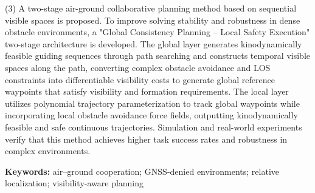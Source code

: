 (3) A two-stage air-ground collaborative planning method based on sequential visible spaces is proposed. To improve solving stability and robustness in dense obstacle environments, a "Global Consistency Planning – Local Safety Execution" two-stage architecture is developed. The global layer generates kinodynamically feasible guiding sequences through path searching and constructs temporal visible spaces along the path, converting complex obstacle avoidance and LOS constraints into differentiable visibility costs to generate global reference waypoints that satisfy visibility and formation requirements. The local layer utilizes polynomial trajectory parameterization to track global waypoints while incorporating local obstacle avoidance force fields, outputting kinodynamically feasible and safe continuous trajectories. Simulation and real-world experiments verify that this method achieves higher task success rates and robustness in complex environments.

\vspace{1em}
\noindent \textbf{Keywords:} air–ground cooperation; GNSS-denied environments; relative localization; visibility-aware planning